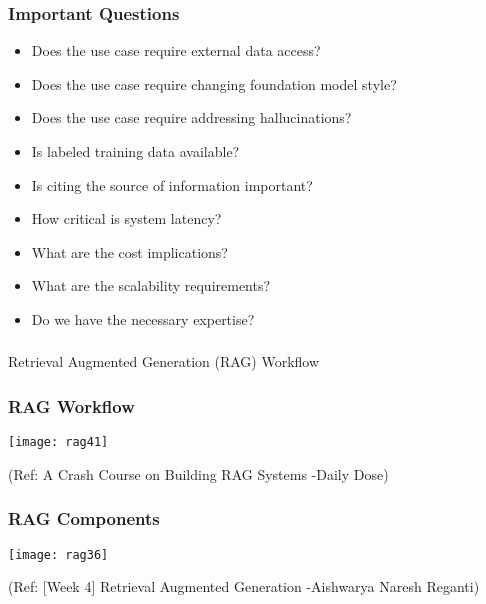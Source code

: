 \begin{frame}[fragile]\frametitle{Important Questions}
\begin{itemize}
  \item Does the use case require external data access?
  \item Does the use case require changing foundation model style?
  \item Does the use case require addressing hallucinations?
  \item Is labeled training data available?
  \item Is citing the source of information important?
  \item How critical is system latency?
  \item What are the cost implications?
  \item What are the scalability requirements?
  \item Do we have the necessary expertise?
\end{itemize}
\end{frame}



\begin{frame}[fragile]\frametitle{}
\begin{center}
{\Large Retrieval Augmented Generation (RAG) Workflow}
\end{center}
\end{frame}

\begin{frame}[fragile]\frametitle{RAG Workflow}


		\begin{center}
		\texttt{[image: rag41]}
		\end{center}

{\tiny (Ref: A Crash Course on Building RAG Systems -Daily Dose)}

\end{frame}


\begin{frame}[fragile]\frametitle{RAG Components}


		\begin{center}
		\texttt{[image: rag36]}
		\end{center}

{\tiny (Ref: [Week 4] Retrieval Augmented Generation -Aishwarya Naresh Reganti)}

\end{frame}

